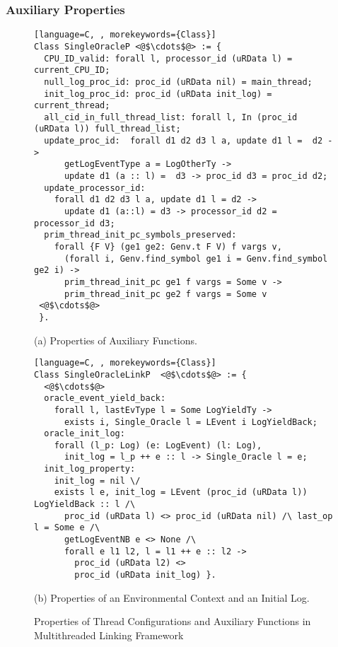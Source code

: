 \subsubsection{Auxiliary Properties}


\begin{figure}
\begin{lstlisting}[language=C, , morekeywords={Class}]
Class SingleOracleP <@$\cdots$@> := {
  CPU_ID_valid: forall l, processor_id (uRData l) = current_CPU_ID;
  null_log_proc_id: proc_id (uRData nil) = main_thread;
  init_log_proc_id: proc_id (uRData init_log) = current_thread;
  all_cid_in_full_thread_list: forall l, In (proc_id (uRData l)) full_thread_list;
  update_proc_id:  forall d1 d2 d3 l a, update d1 l =  d2 ->
      getLogEventType a = LogOtherTy ->
      update d1 (a :: l) =  d3 -> proc_id d3 = proc_id d2;
  update_processor_id:
    forall d1 d2 d3 l a, update d1 l = d2 -> 
      update d1 (a::l) = d3 -> processor_id d2 = processor_id d3;   
  prim_thread_init_pc_symbols_preserved:
    forall {F V} (ge1 ge2: Genv.t F V) f vargs v,
      (forall i, Genv.find_symbol ge1 i = Genv.find_symbol ge2 i) ->
      prim_thread_init_pc ge1 f vargs = Some v ->
      prim_thread_init_pc ge2 f vargs = Some v
 <@$\cdots$@>      
 }.
\end{lstlisting}
\begin{center}
(a) Properties of Auxiliary Functions.
\end{center}

\begin{lstlisting}[language=C, , morekeywords={Class}]
Class SingleOracleLinkP  <@$\cdots$@> := {
  <@$\cdots$@>
  oracle_event_yield_back:
    forall l, lastEvType l = Some LogYieldTy ->
      exists i, Single_Oracle l = LEvent i LogYieldBack;
  oracle_init_log:
    forall (l_p: Log) (e: LogEvent) (l: Log),
      init_log = l_p ++ e :: l -> Single_Oracle l = e;
  init_log_property:
    init_log = nil \/
    exists l e, init_log = LEvent (proc_id (uRData l)) LogYieldBack :: l /\
      proc_id (uRData l) <> proc_id (uRData nil) /\ last_op l = Some e /\
      getLogEventNB e <> None /\
      forall e l1 l2, l = l1 ++ e :: l2 ->
        proc_id (uRData l2) <> 
        proc_id (uRData init_log) }.
\end{lstlisting}
\begin{center}
(b) Properties of an Environmental Context and an Initial Log.
\end{center}
\caption{Properties of Thread Configurations and Auxiliary Functions in Multithreaded Linking Framework}	
\label{fig:chapter:conlink:multithreaded-configuration-props}
\end{figure}

